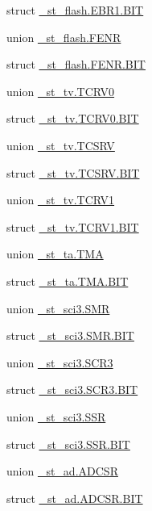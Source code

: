 \begin{DoxyCompactItemize}
struct \hyperlink{3694s_8h_d7/d39/struct__st__flash_8EBR1_8BIT}{\+\_\+st\+\_\+flash.\+E\+B\+R1.\+B\+I\+T}
\item 
union \hyperlink{3694s_8h_dc/d43/union__st__flash_8FENR}{\+\_\+st\+\_\+flash.\+F\+E\+N\+R}
\item 
struct \hyperlink{3694s_8h_d0/da3/struct__st__flash_8FENR_8BIT}{\+\_\+st\+\_\+flash.\+F\+E\+N\+R.\+B\+I\+T}
\item 
union \hyperlink{3694s_8h_d2/d1d/union__st__tv_8TCRV0}{\+\_\+st\+\_\+tv.\+T\+C\+R\+V0}
\item 
struct \hyperlink{3694s_8h_d8/d7a/struct__st__tv_8TCRV0_8BIT}{\+\_\+st\+\_\+tv.\+T\+C\+R\+V0.\+B\+I\+T}
\item 
union \hyperlink{3694s_8h_df/df9/union__st__tv_8TCSRV}{\+\_\+st\+\_\+tv.\+T\+C\+S\+R\+V}
\item 
struct \hyperlink{3694s_8h_da/d61/struct__st__tv_8TCSRV_8BIT}{\+\_\+st\+\_\+tv.\+T\+C\+S\+R\+V.\+B\+I\+T}
\item 
union \hyperlink{3694s_8h_dc/dd5/union__st__tv_8TCRV1}{\+\_\+st\+\_\+tv.\+T\+C\+R\+V1}
\item 
struct \hyperlink{3694s_8h_d1/dc1/struct__st__tv_8TCRV1_8BIT}{\+\_\+st\+\_\+tv.\+T\+C\+R\+V1.\+B\+I\+T}
\item 
union \hyperlink{3694s_8h_db/dee/union__st__ta_8TMA}{\+\_\+st\+\_\+ta.\+T\+M\+A}
\item 
struct \hyperlink{3694s_8h_d6/de9/struct__st__ta_8TMA_8BIT}{\+\_\+st\+\_\+ta.\+T\+M\+A.\+B\+I\+T}
\item 
union \hyperlink{3694s_8h_dc/dd8/union__st__sci3_8SMR}{\+\_\+st\+\_\+sci3.\+S\+M\+R}
\item 
struct \hyperlink{3694s_8h_dd/db4/struct__st__sci3_8SMR_8BIT}{\+\_\+st\+\_\+sci3.\+S\+M\+R.\+B\+I\+T}
\item 
union \hyperlink{3694s_8h_db/db8/union__st__sci3_8SCR3}{\+\_\+st\+\_\+sci3.\+S\+C\+R3}
\item 
struct \hyperlink{3694s_8h_d7/d31/struct__st__sci3_8SCR3_8BIT}{\+\_\+st\+\_\+sci3.\+S\+C\+R3.\+B\+I\+T}
\item 
union \hyperlink{3694s_8h_dc/def/union__st__sci3_8SSR}{\+\_\+st\+\_\+sci3.\+S\+S\+R}
\item 
struct \hyperlink{3694s_8h_d1/dd2/struct__st__sci3_8SSR_8BIT}{\+\_\+st\+\_\+sci3.\+S\+S\+R.\+B\+I\+T}
\item 
union \hyperlink{3694s_8h_d1/db6/union__st__ad_8ADCSR}{\+\_\+st\+\_\+ad.\+A\+D\+C\+S\+R}
\item 
struct \hyperlink{3694s_8h_d4/dc9/struct__st__ad_8ADCSR_8BIT}{\+\_\+st\+\_\+ad.\+A\+D\+C\+S\+R.\+B\+I\+T}

\end{DoxyCompactItemize}
